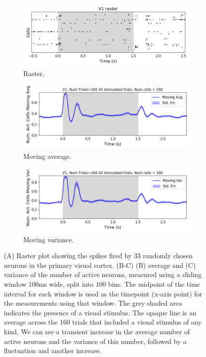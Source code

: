     \begin{figure}[p]
      \begin{subfigure}[h]{\linewidth}
        \includegraphics[width=\linewidth]{figures/conway_maxwell/v1_raster_16.png}
        \caption{Raster.}
        \label{fig:v1_raster}
      \end{subfigure}
      \begin{subfigure}[h]{\linewidth}
        \includegraphics[width=\linewidth]{figures/conway_maxwell/v1_1ms_moving_avg_all_stimulated_trials.png}
        \caption{Moving average.}
        \label{fig:v1_moving_avg_num_active_cells}
      \end{subfigure}
      \begin{subfigure}[h]{\linewidth}
        \includegraphics[width=\linewidth]{figures/conway_maxwell/v1_1ms_moving_var_all_stimulated_trials.png}
        \caption{Moving variance.}
        \label{fig:v1_moving_var_num_active_cells}
      \end{subfigure}
      \caption{(A) Raster plot showing the spikes fired by $33$ randomly chosen neurons in the primary visual cortex. (B-C) (B) average and (C) variance of the number of active neurons, measured using a sliding window $100$ms wide, split into $100$ bins. The midpoint of the time interval for each window is used as the timepoint (x-axis point) for the measurements using that window. The grey shaded area indicates the presence of a visual stimulus. The opaque line is an average across the $160$ trials that included a visual stimulus of any kind. We can see a transient increase in the average number of active neurons and the variance of this number, followed by a fluctuation and another increase.}

\end{figure}
